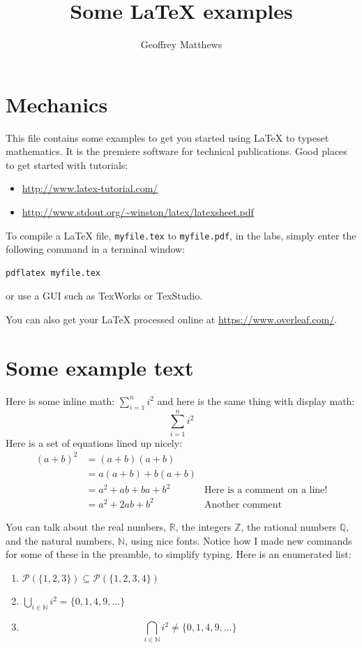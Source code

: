 \documentclass{article}
\title{Some \LaTeX{} examples}
\author{Geoffrey Matthews}
\newcommand{\R}{\mathbb{R}}
\newcommand{\N}{\mathbb{N}}
\begin{document}
\maketitle

\section{Mechanics}
This file contains some examples to get you started using \LaTeX{} to
typeset mathematics.  It is the premiere software for technical
publications.  Good places to get started with tutorials: 
\begin{itemize}
\item \url{http://www.latex-tutorial.com/}
\item \url{http://www.stdout.org/~winston/latex/latexsheet.pdf}
\end{itemize}

To compile a \LaTeX{} file, {\tt myfile.tex} to {\tt myfile.pdf}, 
in the labs, simply enter the
following command in a terminal window:
\begin{Verbatim}[frame=single]
pdflatex myfile.tex
\end{Verbatim}
or use a GUI such as TexWorks or TexStudio.

You can also get your \LaTeX{} processed online at
\url{https://www.overleaf.com/}.

\section{Some example text}
Here is some inline math:  $\sum_{i=1}^{n} i^2$ and
here is the same thing with display math:
\[
\sum_{i=1}^{n} i^2
\]
Here is a set of equations lined up nicely:
\begin{align*}
(a+b)^2 &= (a+b)(a+b) \\
        &= a(a+b) + b(a+b) \\
        &= a^2 + ab + ba + b^2  & \mbox{Here is a comment on a line!}\\
        &= a^2 + 2ab + b^2      & \mbox{Another comment}
\end{align*}

You can talk about the real numbers, $\R$, the integers $\mathbb{Z}$, the
rational numbers $\mathbb{Q}$, and the natural numbers,
$\N$, using nice fonts.  Notice how I made new commands for some of these in
the preamble, to simplify typing.
Here is an enumerated list:
\begin{enumerate}

\item $\mathcal{P}(\{1,2,3\}) \subseteq \mathcal{P}(\{1,2,3,4\})$

\item
$
\bigcup_{i\in\N}i^2 = \{0,1,4,9,\ldots\}
$

\item
\[
\bigcap_{i\in\N}i^2 \not= \{0,1,4,9,\ldots\}
\]

\end{enumerate}
\end{document}
